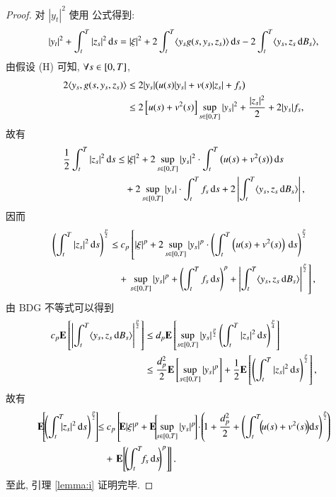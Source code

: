 \begin{proof}
对 $|y_t|^2$ 使用 \Ito{} 公式得到:
\begin{equation}
  |y_t|^2+\int^T_t |z_s|^2\,\mathrm{d} s=
  |\xi|^2+
  2\int^T_t\langle y_s g(s,y_s,z_s)\rangle\,\mathrm{d} s
  -2\int^T_t\langle y_s,z_s\,\mathrm{d} B_s\rangle,
\end{equation}
由假设 (H) 可知, $\forall s\in[0,T]$,
\begin{align*}
  2\langle y_s,g(s,y_s,z_s)\rangle & \leq 2|y_s|\big(u(s)|y_s|+v(s)|z_s|+f_s\big)\\
          & \leq 2\left[u(s)+v^2(s)\right]\sup_{s\in[0,T]}|y_s|^2+\frac{|z_s|^2}{2}+2|y_s|f_s,
\end{align*}
故有
\begin{align*}
  \frac{1}{2}\int^T_t |z_s|^2\dif s \leq &\ |\xi|^2+2\sup_{s\in\tT}|y_s|^2\cdot
        \int^T_t\big(u(s)+v^2(s)\big)\dif s\\
        & +2\sup_{s\in\tT}|y_s|\cdot\int^T_t f_s\dif s
          +2\left|\int^T_t\langle y_s,z_s\dif B_s\rangle\right|,
\end{align*}
因而
\begin{align*}
  \left(\int^T_t |z_s|^2\,\mathrm{d} s\right)^{p\over 2} \leq &\  c_p\left[|\xi|^p
          +2\sup_{s\in[0,T]}|y_s|^p\cdot\left(\int^T_t\left(u(s)+v^2(s)\right)
           \,\mathrm{d} s\right)^{p\over 2}\right.\\
         & +\left.\sup_{s\in[0,T]}|y_s|^p+\left(\int^T_t f_s\,\mathrm{d} s\right)^p
           +\left|\int^T_t\langle y_s,z_s\,\mathrm{d} B_s\rangle\right|^{p\over 2}\right],
\end{align*}
由 BDG 不等式可以得到
\begin{align*}
  c_p\mathrm{\mathbf{E}}\left[\left|\int^T_t\langle y_s,z_s\,\mathrm{d} B_s\rangle\right|^{p\over 2}\right]
    &\leq d_p\mathrm{\mathbf{E}}\left[\sup_{s\in[0,T]}|y_s|^{p\over 2}\left(\int^T_t|z_s|^2\,\mathrm{d} s\right)^{p\over 4}\right]\\
    &\leq {d^2_p\over 2}\mathrm{\mathbf{E}}\left[\sup_{s\in[0,T]}|y_s|^p\right]
          +\frac{1}{2}\mathrm{\mathbf{E}}\left[\left(\int^T_t|z_s|^2\,\mathrm{d} s\right)^{p\over 2}\right],
\end{align*}
故有
\begin{align*}
  \EX\!\!\left[\!
        \left(
           \int^T_t\!\!\!|z_s|^2\dif s
        \right)^{p\over 2}\!
     \right]\!\!
     \leq &\ c_p
     \left[\!
        \EX|\xi|^p+\EX\!\!
        \left[\!
           \sup_{s\in\tT}|y_s|^p\!
        \right]\!\cdot\!
           \left(\!
              1+\frac{d^2_p}{2}+
                \left(
                   \int^T_t\!\!\left(\!u(s)+v^2(s)\!\right)\!\!\dif s
                \right)^{p\over 2}\!
           \right)\!
     \right.\\
     & +\left.\EX\!
          \left[\!
             \left(\!\int^T_t\!\! f_s\dif s\!\right)^p
          \right]\!
       \right].
\end{align*}
至此, 引理 \ref{lemma:i} 证明完毕.
\end{proof}

